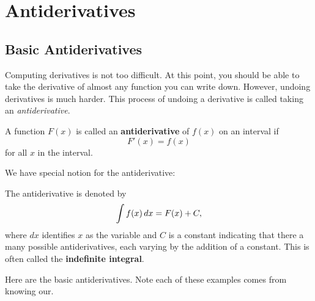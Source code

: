 \chapter{Antiderivatives}

\section{Basic Antiderivatives}

Computing derivatives is not too difficult. At this point, you should
be able to take the derivative of almost any function you can write
down. However, undoing derivatives is much harder. This process of
undoing a derivative is called taking an \textit{antiderivative}.

\begin{definition}
A function $F(x)$ is called an \textbf{antiderivative} of $f(x)$ on an
interval if
\[
F'(x) = f(x)
\]
for all $x$ in the interval.
\end{definition}

We have special notion for the antiderivative:

\begin{definition}
The antiderivative is denoted by
\[
\int f(x) \, d x = F(x)+C,
\]
where $dx$ identifies $x$ as the variable and $C$ is a constant
indicating that there a many possible antiderivatives, each varying by
the addition of a constant.  This is often called the
\textbf{indefinite integral}.
\end{definition}

Here are the basic antiderivatives. Note each of these examples comes
from knowing our.


